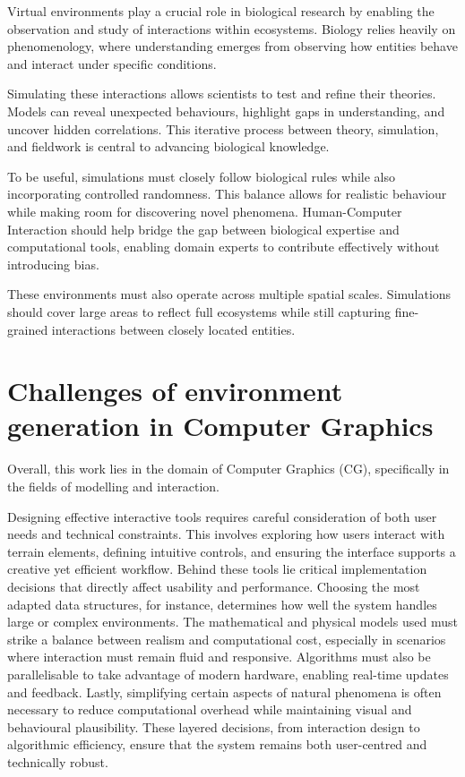 Virtual environments play a crucial role in biological research by enabling the observation and study of interactions within ecosystems. Biology relies heavily on phenomenology, where understanding emerges from observing how entities behave and interact under specific conditions.

Simulating these interactions allows scientists to test and refine their theories. Models can reveal unexpected behaviours, highlight gaps in understanding, and uncover hidden correlations. This iterative process between theory, simulation, and fieldwork is central to advancing biological knowledge.

To be useful, simulations must closely follow biological rules while also incorporating controlled randomness. This balance allows for realistic behaviour while making room for discovering novel phenomena. Human-Computer Interaction should help bridge the gap between biological expertise and computational tools, enabling domain experts to contribute effectively without introducing bias.


These environments must also operate across multiple spatial scales. Simulations should cover large areas to reflect full ecosystems while still capturing fine-grained interactions between closely located entities.

\section{Challenges of environment generation in Computer Graphics}

Overall, this work lies in the domain of Computer Graphics (CG), specifically in the fields of modelling and interaction.

Designing effective interactive tools requires careful consideration of both user needs and technical constraints. This involves exploring how users interact with terrain elements, defining intuitive controls, and ensuring the interface supports a creative yet efficient workflow. Behind these tools lie critical implementation decisions that directly affect usability and performance. Choosing the most adapted data structures, for instance, determines how well the system handles large or complex environments. The mathematical and physical models used must strike a balance between realism and computational cost, especially in scenarios where interaction must remain fluid and responsive. Algorithms must also be parallelisable to take advantage of modern hardware, enabling real-time updates and feedback. Lastly, simplifying certain aspects of natural phenomena is often necessary to reduce computational overhead while maintaining visual and behavioural plausibility. These layered decisions, from interaction design to algorithmic efficiency, ensure that the system remains both user-centred and technically robust.




